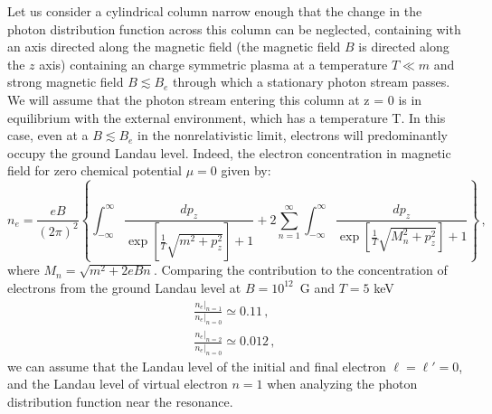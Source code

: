\documentclass[
aps,%
12pt,%
final,%
notitlepage,%
oneside,%
onecolumn,%
nobibnotes,%
nofootinbib,%
superscriptaddress,%
noshowpacs,%
centertags]%
{revtex4}
\begin{document}
Let us consider a cylindrical column narrow enough that the change in the photon distribution function across this column can be neglected, containing with an axis directed along the magnetic field (the magnetic field $B$ is directed along the $z$ axis) containing an charge symmetric plasma at a temperature $T\ll m$ and strong magnetic field $B\lesssim B_e$ through which a stationary photon stream passes. We will assume that the photon stream entering this column at z = 0 is in equilibrium with the external environment, which has a temperature T.
In this case, even at a $B\lesssim B_e$ in the nonrelativistic limit, electrons will predominantly occupy the ground Landau level. Indeed, the electron concentration in magnetic field for zero chemical potential $\mu=0$ given by:
\begin{equation}
	n_e = \frac{eB}{(2\pi)^2} \left\{ \int_{-\infty}^{\infty}\frac{dp_z}{\exp\left[\frac{1}{T}\sqrt{m^2+p_z^2}\right]+1}+2\sum_{n=1}^{\infty}
	\int_{-\infty}^{\infty}\frac{dp_z}{\exp\left[\frac{1}{T}\sqrt{M_n^2+p_z^2}\right]+1}\right\}\, ,
\end{equation}
where $M_n=\sqrt{m^2+2eBn}$. Comparing the contribution to the concentration of electrons from the ground Landau level at $B= 10^{12}$~G and $T=5$ keV
\begin{equation}
	\begin{gathered}
		\frac{n_e|_{n=1}}{n_e|_{n=0}}\simeq 0.11\, ,\\
		\frac{n_e|_{n=2}}{n_  e|_{n=0}}\simeq 0.012\, ,
	\end{gathered}
\end{equation}
we can assume that the Landau level of the initial and final electron $\ell=\ell'=0$, and the Landau level of virtual electron $n=1$ when analyzing the photon distribution function near the resonance.
\end{document}
